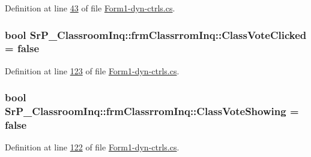 \-Definition at line \hyperlink{_form1-dyn-ctrls_8cs_source_l00043}{43} of file \hyperlink{_form1-dyn-ctrls_8cs_source}{\-Form1-\/dyn-\/ctrls.\-cs}.

\hypertarget{class_sr_p___classroom_inq_1_1frm_classrrom_inq_a1e2c8341b4d2988c61648bea9a4c412b}{
\subsubsection[{\-Class\-Vote\-Clicked}]{\setlength{\rightskip}{0pt plus 5cm}bool {\bf \-Sr\-P\-\_\-\-Classroom\-Inq\-::frm\-Classrrom\-Inq\-::\-Class\-Vote\-Clicked} = false}}
\label{class_sr_p___classroom_inq_1_1frm_classrrom_inq_a1e2c8341b4d2988c61648bea9a4c412b}


\-Definition at line \hyperlink{_form1-dyn-ctrls_8cs_source_l00123}{123} of file \hyperlink{_form1-dyn-ctrls_8cs_source}{\-Form1-\/dyn-\/ctrls.\-cs}.

\hypertarget{class_sr_p___classroom_inq_1_1frm_classrrom_inq_ae23aa3324c19688aa8d35b0217cf9605}{
\subsubsection[{\-Class\-Vote\-Showing}]{\setlength{\rightskip}{0pt plus 5cm}bool {\bf \-Sr\-P\-\_\-\-Classroom\-Inq\-::frm\-Classrrom\-Inq\-::\-Class\-Vote\-Showing} = false}}
\label{class_sr_p___classroom_inq_1_1frm_classrrom_inq_ae23aa3324c19688aa8d35b0217cf9605}


\-Definition at line \hyperlink{_form1-dyn-ctrls_8cs_source_l00122}{122} of file \hyperlink{_form1-dyn-ctrls_8cs_source}{\-Form1-\/dyn-\/ctrls.\-cs}.

